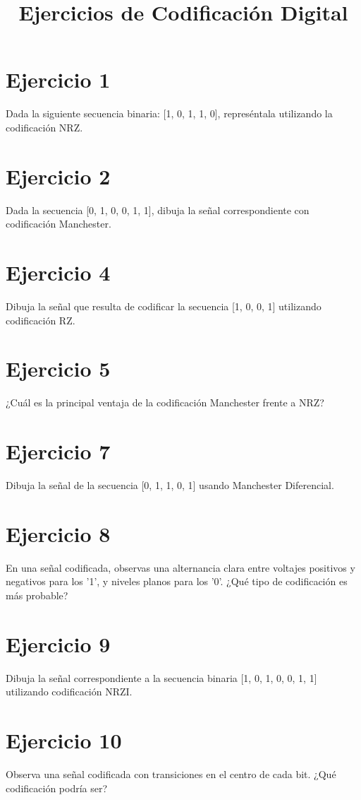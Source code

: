 \documentclass[a4paper,12pt]{article}
\title{Ejercicios de Codificación Digital}
\author{}
\date{}
\begin{document}
\maketitle
\section*{Ejercicio 1}
Dada la siguiente secuencia binaria: [1, 0, 1, 1, 0], represéntala utilizando la codificación NRZ.

\section*{Ejercicio 2}
Dada la secuencia [0, 1, 0, 0, 1, 1], dibuja la señal correspondiente con codificación Manchester.


\section*{Ejercicio 4}
Dibuja la señal que resulta de codificar la secuencia [1, 0, 0, 1] utilizando codificación RZ.

\section*{Ejercicio 5}
¿Cuál es la principal ventaja de la codificación Manchester frente a NRZ?


\section*{Ejercicio 7}
Dibuja la señal de la secuencia [0, 1, 1, 0, 1] usando Manchester Diferencial.

\section*{Ejercicio 8}
En una señal codificada, observas una alternancia clara entre voltajes positivos y negativos para los '1', y niveles planos para los '0'. ¿Qué tipo de codificación es más probable?

\section*{Ejercicio 9}
Dibuja la señal correspondiente a la secuencia binaria [1, 0, 1, 0, 0, 1, 1] utilizando codificación NRZI.

\section*{Ejercicio 10}
Observa una señal codificada con transiciones en el centro de cada bit. ¿Qué codificación podría ser?
\end{document}
